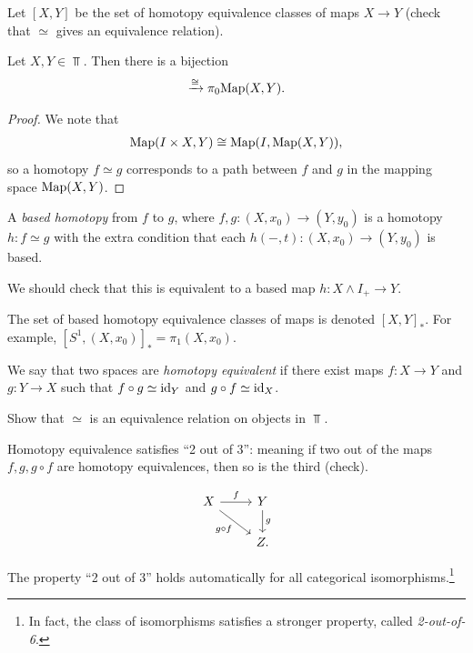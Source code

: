 \documentclass{article}[11pt]
\newcommand{\smashprod}{\wedge} %
\begin{document}
\begin{definition} Let $[X,Y]$ be the set of homotopy equivalence classes of maps $X\to Y$ (check that $\simeq$ gives an equivalence relation).
\end{definition}

\begin{proposition} Let $X,Y \in \Top$. Then there is a bijection
\begin{align*}
	[X,Y] \xto{\cong} \pi_0 \Map(X,Y).
\end{align*}
\end{proposition}
\begin{proof} We note that
\begin{align*}
	\textup{Map}(I\times X, Y) \cong \textup{Map}(I, \textup{Map}(X,Y)),
\end{align*}
so a homotopy $f\simeq g$ corresponds to a path between $f$ and $g$ in the mapping space $\textup{Map}(X,Y)$.
\end{proof}

\begin{definition}\label{def:based-homotopy} A \textit{based homotopy} from $f$ to $g$, where $f,g : (X,x_0) \to (Y,y_0)$ is a homotopy $h:f\simeq g$ with the extra condition that each $h(-,t) : (X,x_0) \to (Y,y_0)$ is based.

We should check that this is equivalent to a based map $h : X \smashprod I_+ \to Y$.
\end{definition}

\begin{notation} The set of based homotopy equivalence classes of maps is denoted $[X,Y]_\ast$. For example, $[S^1, (X,x_0)]_\ast = \pi_1(X,x_0)$.
\end{notation}

\begin{definition} We say that two spaces are \textit{homotopy equivalent} if there exist maps $f: X \to Y$ and $g : Y \to X$ such that $f\circ g\simeq \text{id}_Y$ and $g\circ f \simeq \text{id}_X$.
\end{definition}

\begin{exercise} Show that $\simeq$ is an equivalence relation on objects in $\Top$.
\end{exercise}

\begin{proposition} Homotopy equivalence satisfies ``2 out of 3'': meaning if two out of the maps $f, g, g\circ f$ are homotopy equivalences, then so is the third (check).

\[
	\begin{tikzcd}
	X\rar["f"]\ar[dr,"g\circ f" below left] & Y\dar["g" right] \\
	 & Z.
	\end{tikzcd}
\]

\begin{note} The property ``2 out of 3'' holds automatically for all categorical isomorphisms.\footnote{In fact, the class of isomorphisms satisfies a stronger property, called \textit{2-out-of-6}.}
\end{note}

\end{proposition}
\end{document}
